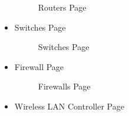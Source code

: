 \documentclass[a4Paper,12pt]{report}
\begin{document}
\begin{itemize}
\begin{figure}[H]
\caption{Routers Page}
\end{figure}
\item Switches Page
\begin{figure}[H]
\centering
{}
\caption{Switches Page}
\end{figure}
\item Firewall Page
\begin{figure}[H]
\centering
{}
\caption{Firewalls Page}
\end{figure}
\item Wireless LAN Controller Page
\begin{figure}[H]
\centering
{}

\end{figure}
\end{itemize}
\end{document}
